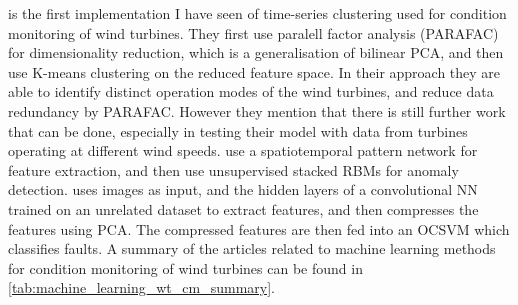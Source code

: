 \textcite{fault_detect_PARAFAC_k_means} is the first implementation I have seen of time-series clustering used for condition monitoring of wind turbines. They first use paralell factor analysis (PARAFAC) for dimensionality reduction, which is a generalisation of bilinear PCA, and then use K-means clustering on the reduced feature space. In their approach they are able to identify distinct operation modes of the wind turbines, and reduce data redundancy by PARAFAC. However they mention that there is still further work that can be done, especially in testing their model with data from turbines operating at different wind speeds. \textcite{unsup_graphical_modeling_wt_cm} use a spatiotemporal pattern network for feature extraction, and then use unsupervised stacked RBMs for anomaly detection. \textcite{unsupervised_AD_blade_damage_deep_features_images} uses images as input, and the hidden layers of a convolutional NN trained on an unrelated dataset to extract features, and then compresses the features using PCA. The compressed features are then fed into an OCSVM which classifies faults. A summary of the articles related to machine learning methods for condition monitoring of wind turbines can be found in \ref{tab:machine_learning_wt_cm_summary}.